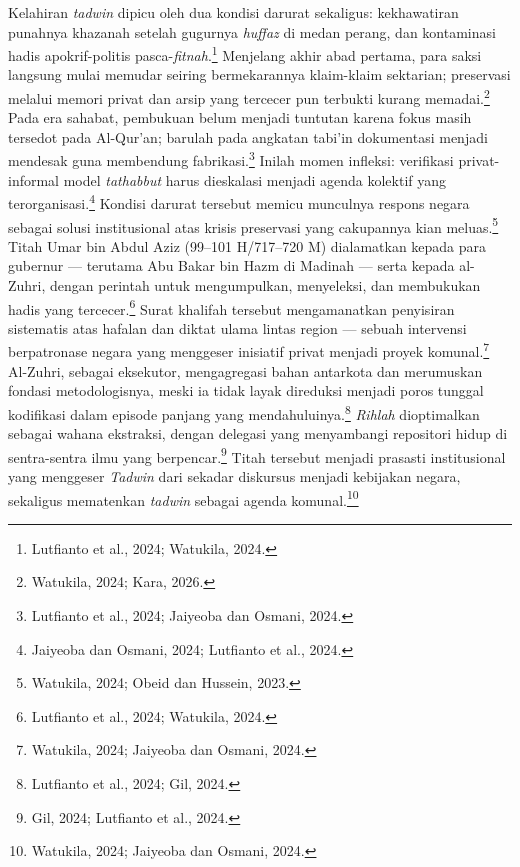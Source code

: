 Kelahiran \textit{tadwin} dipicu oleh dua kondisi darurat sekaligus: kekhawatiran punahnya khazanah setelah gugurnya \textit{huffaz} di medan perang, dan kontaminasi hadis apokrif-politis pasca-\textit{fitnah}.\footnote{Lutfianto et al., 2024; Watukila, 2024.} Menjelang akhir abad pertama, para saksi langsung mulai memudar seiring bermekarannya klaim-klaim sektarian; preservasi melalui memori privat dan arsip yang tercecer pun terbukti kurang memadai.\footnote{Watukila, 2024; Kara, 2026.} Pada era sahabat, pembukuan belum menjadi tuntutan karena fokus masih tersedot pada Al-Qur'an; barulah pada angkatan tabi'in dokumentasi menjadi mendesak guna membendung fabrikasi.\footnote{Lutfianto et al., 2024; Jaiyeoba dan Osmani, 2024.} Inilah momen infleksi: verifikasi privat-informal model \textit{tathabbut} harus dieskalasi menjadi agenda kolektif yang terorganisasi.\footnote{Jaiyeoba dan Osmani, 2024; Lutfianto et al., 2024.} Kondisi darurat tersebut memicu munculnya respons negara sebagai solusi institusional atas krisis preservasi yang cakupannya kian meluas.\footnote{Watukila, 2024; Obeid dan Hussein, 2023.} Titah Umar bin Abdul Aziz (99--101 H/717--720 M) dialamatkan kepada para gubernur --- terutama Abu Bakar bin Hazm di Madinah --- serta kepada al-Zuhri, dengan perintah untuk mengumpulkan, menyeleksi, dan membukukan hadis yang tercecer.\footnote{Lutfianto et al., 2024; Watukila, 2024.} Surat khalifah tersebut mengamanatkan penyisiran sistematis atas hafalan dan diktat ulama lintas region --- sebuah intervensi berpatronase negara yang menggeser inisiatif privat menjadi proyek komunal.\footnote{Watukila, 2024; Jaiyeoba dan Osmani, 2024.} Al-Zuhri, sebagai eksekutor, mengagregasi bahan antarkota dan merumuskan fondasi metodologisnya, meski ia tidak layak direduksi menjadi poros tunggal kodifikasi dalam episode panjang yang mendahuluinya.\footnote{Lutfianto et al., 2024; Gil, 2024.} \textit{Rihlah} dioptimalkan sebagai wahana ekstraksi, dengan delegasi yang menyambangi repositori hidup di sentra-sentra ilmu yang berpencar.\footnote{Gil, 2024; Lutfianto et al., 2024.} Titah tersebut menjadi prasasti institusional yang menggeser \textit{Tadwin} dari sekadar diskursus menjadi kebijakan negara, sekaligus mematenkan \textit{tadwin} sebagai agenda komunal.\footnote{Watukila, 2024; Jaiyeoba dan Osmani, 2024.}

